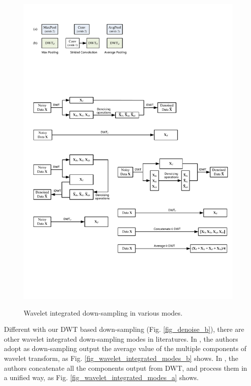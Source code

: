 \documentclass[10pt,twocolumn,letterpaper]{article}
\begin{document}
\begin{figure}[bpt]
{		\includegraphics*[scale=0.725, viewport=267 179 585 204]{figures/Visio-down_sampling_of_dwt.pdf}
	}
	\caption{Wavelet integrated down-sampling in various modes.}
	\label{fig_wavelet_integrated_modes}
\end{figure}
Different with our DWT based down-sampling (Fig. \ref{fig_denoise_b}),
there are other wavelet integrated down-sampling modes in literatures.
In \cite{duan2017sar}, the authors adopt as down-sampling output the average value of the multiple components of wavelet transform,
as Fig. \ref{fig_wavelet_integrated_modes_b} shows.
In \cite{liu2018multi}, the authors concatenate all the components output from DWT, and process them in a unified way,
as Fig. \ref{fig_wavelet_integrated_modes_a} shows.
\end{document}
